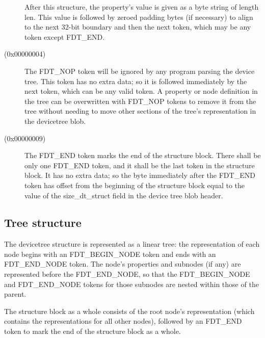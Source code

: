 \documentclass[a4paper,10pt,oneside]{sphinxmanual}
\begin{document}
\begin{description}
After this structure, the property’s value is given as a byte string of
length len. This value is followed by zeroed padding bytes (if
necessary) to align to the next 32-bit boundary and then the next token,
which may be any token except FDT\_END.

\item[{\code{FDT\_NOP} (0x00000004)}] \leavevmode
The FDT\_NOP token will be ignored by any program parsing the device
tree. This token has no extra data; so it is followed immediately by
the next token, which can be any valid token. A property or node
definition in the tree can be overwritten with FDT\_NOP tokens to
remove it from the tree without needing to move other sections of
the tree’s representation in the devicetree blob.

\item[{\code{FDT\_END} (0x00000009)}] \leavevmode
The FDT\_END token marks the end of the structure block. There shall
be only one FDT\_END token, and it shall be the last token in the
structure block. It has no extra data; so the byte immediately after
the FDT\_END token has offset from the beginning of the structure
block equal to the value of the size\_dt\_struct field in the device
tree blob header.

\end{description}


\subsection{Tree structure}
\label{flattened-format:tree-structure}
The devicetree structure is represented as a linear tree: the
representation of each node begins with an FDT\_BEGIN\_NODE token and
ends with an FDT\_END\_NODE token. The node’s properties and subnodes
(if any) are represented before the FDT\_END\_NODE, so that the
FDT\_BEGIN\_NODE and FDT\_END\_NODE tokens for those subnodes are nested
within those of the parent.

The structure block as a whole consists of the root node’s
representation (which contains the representations for all other nodes),
followed by an FDT\_END token to mark the end of the structure block as
a whole.
\end{document}
